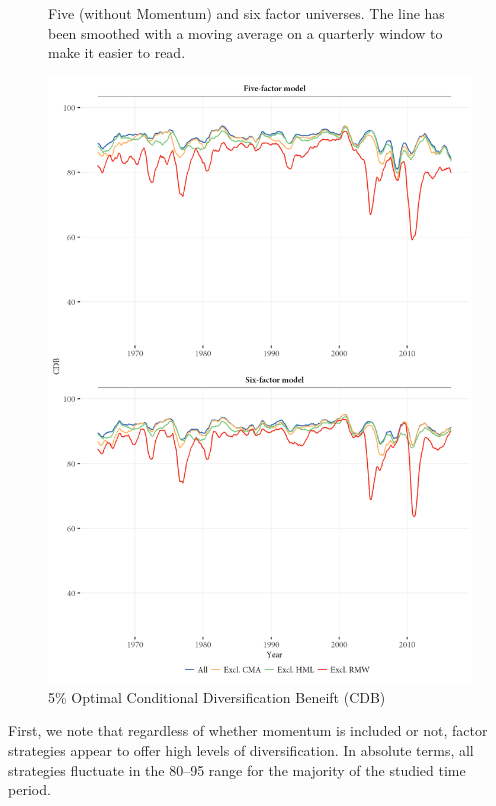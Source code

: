 \begin{figure}[!ht]
  \centering
  \footnotesize
  \renewcommand{\arraystretch}{1.2}
  \caption{5\% Optimal Conditional Diversification Beneift (CDB)}

  \begin{longcaption}
    Five (without Momentum) and six factor universes. The line has been smoothed with a moving average on a quarterly window to make it easier to read.
  \end{longcaption}
  \label{fig:cdb}
  \includegraphics[scale = 1]{graphics/cdb/CDB.png}
\end{figure}

First, we note that regardless of whether momentum is included or not, factor strategies appear to offer high levels of diversification. In absolute terms, all strategies fluctuate in the 80--95 range for the majority of the studied time period. 

